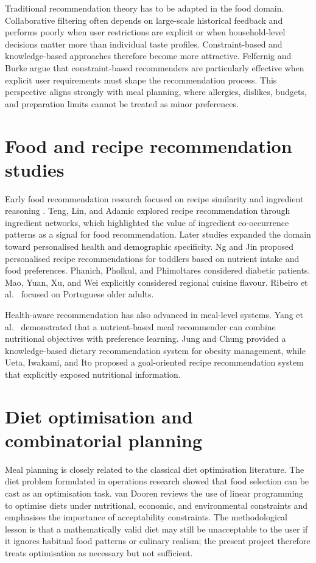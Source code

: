 Traditional recommendation theory has to be adapted in the food domain. Collaborative filtering often depends on large-scale historical feedback and performs poorly when user restrictions are explicit or when household-level decisions matter more than individual taste profiles. Constraint-based and knowledge-based approaches therefore become more attractive. Felfernig and Burke \cite{felfernig2008} argue that constraint-based recommenders are particularly effective when explicit user requirements must shape the recommendation process. This perspective aligns strongly with meal planning, where allergies, dislikes, budgets, and preparation limits cannot be treated as minor preferences.

\section{Food and recipe recommendation studies}

Early food recommendation research focused on recipe similarity and ingredient reasoning \cite{freyne2010a,freyne2010b}. Teng, Lin, and Adamic \cite{teng2012} explored recipe recommendation through ingredient networks, which highlighted the value of ingredient co-occurrence patterns as a signal for food recommendation. Later studies expanded the domain toward personalised health and demographic specificity. Ng and Jin \cite{ng2017} proposed personalised recipe recommendations for toddlers based on nutrient intake and food preferences. Phanich, Pholkul, and Phimoltares \cite{phanich2010} considered diabetic patients. Mao, Yuan, Xu, and Wei \cite{mao2016} explicitly considered regional cuisine flavour. Ribeiro et al.\ \cite{ribeiro2018} focused on Portuguese older adults.

Health-aware recommendation has also advanced in meal-level systems. Yang et al.\ \cite{yang2018} demonstrated that a nutrient-based meal recommender can combine nutritional objectives with preference learning. Jung and Chung \cite{jung2016} provided a knowledge-based dietary recommendation system for obesity management, while Ueta, Iwakami, and Ito \cite{ueta2011} proposed a goal-oriented recipe recommendation system that explicitly exposed nutritional information.

\section{Diet optimisation and combinatorial planning}

Meal planning is closely related to the classical diet optimisation literature. The diet problem formulated in operations research showed that food selection can be cast as an optimisation task. van Dooren \cite{vandooren2018} reviews the use of linear programming to optimise diets under nutritional, economic, and environmental constraints and emphasises the importance of acceptability constraints. The methodological lesson is that a mathematically valid diet may still be unacceptable to the user if it ignores habitual food patterns or culinary realism; the present project therefore treats optimisation as necessary but not sufficient.

